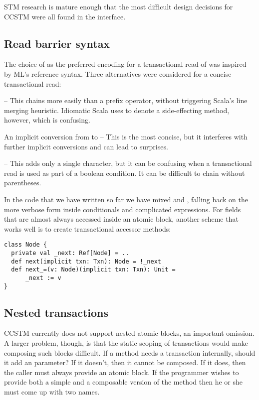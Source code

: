 
STM research is mature enough that the most difficult design decisions
for CCSTM were all found in the interface.

\subsection{Read barrier syntax}
\label{sec:syntax}

The choice of  as the preferred encoding for a transactional
read of  was inspired by ML's reference syntax.  Three alternatives
were considered for a concise transactional read:
\begin{packed_enum}
\item {} -- This chains more easily than a prefix operator, without
triggering Scala's line merging heuristic.  Idiomatic Scala uses \code{()} to
denote a side-effecting method, however, which is confusing.
\item An implicit conversion from  to  -- This is
the most concise, but it interferes with further implicit conversions and
can lead to surprises.
\item {} -- This adds only a single character, but it can be
confusing when a transactional read is used as part of a boolean condition.
It can be difficult to chain without parentheses.
\end{packed_enum}

In the code that we have written so far we have mixed  and
, falling back on the more verbose form inside conditionals and
complicated expressions.  For fields that are almost always accessed inside
an atomic block, another scheme that works well is to create transactional
accessor methods:
\lstset{numbers=none}
\begin{lstlisting}
class Node {
  private val _next: Ref[Node] = ..
  def next(implicit txn: Txn): Node = !_next
  def next_=(v: Node)(implicit txn: Txn): Unit =
      _next := v
}
\end{lstlisting}
\lstset{numbers=left}

\subsection{Nested transactions}

CCSTM currently does not support nested atomic blocks, an important
omission.  A larger problem, though, is that the static scoping
of transactions would make composing such blocks difficult.  If a
method  needs a transaction internally, should it add an
  parameter?  If it doesn't, then it
cannot be composed.  If it does, then the caller must always provide
an atomic block.  If the programmer wishes to provide both a simple
and a composable version of the method then he or she must come up with
two names.


